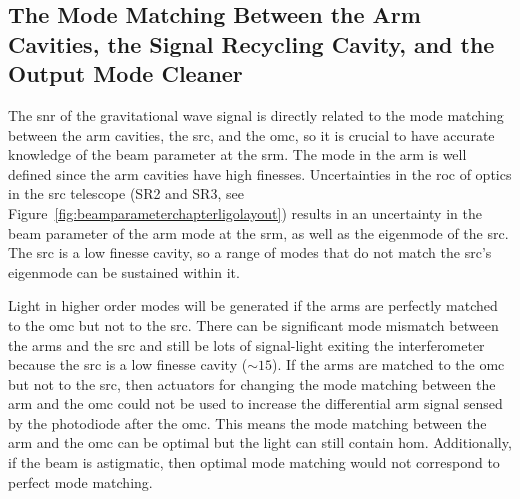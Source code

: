 \subsection{The Mode Matching Between the Arm Cavities, the Signal Recycling Cavity, and the Output Mode Cleaner}
\label{sec:beam_parameter_chapter_mm_the_arm_to_omc}
The \gls{snr} of the gravitational wave signal is directly related to the mode matching between the arm cavities, the \gls{src}, and the \gls{omc}, so it is crucial to have accurate knowledge of the beam parameter at the \gls{srm}. The mode in the arm is well defined since the arm cavities have high finesses. Uncertainties in the \gls{roc} of optics in the \gls{src} telescope (SR2 and SR3, see Figure~\ref{fig:beamparameterchapterligolayout}) results in an uncertainty in the beam parameter of the arm mode at the \gls{srm}, as well as the eigenmode of the \gls{src}. The \gls{src} is a low finesse cavity, so a range of modes that do not match the \gls{src}'s eigenmode can be sustained within it.
\par
Light in higher order modes will be generated if the arms are perfectly matched to the \gls{omc} but not to the \gls{src}. There can be significant mode mismatch between the arms and the \gls{src} and still be lots of signal-light exiting the interferometer because the \gls{src} is a low finesse cavity ($\sim\!15$). If the arms are matched to the \gls{omc} but not to the \gls{src}, then actuators for changing the mode matching between the arm and the \gls{omc} could not be used to increase the differential arm signal sensed by the photodiode after the \gls{omc}. This means the mode matching between the arm and the \gls{omc} can be optimal but the light can still contain \gls{hom}. Additionally, if the beam is astigmatic, then optimal mode matching would not correspond to perfect mode matching.
